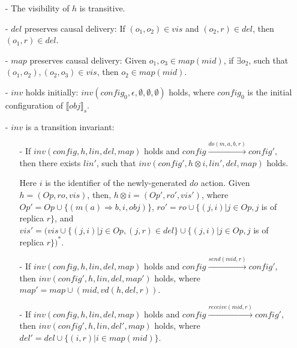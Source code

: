 \begin{itemize}
\setlength{\itemsep}{0.5pt} 
\item[-] The visibility of $h$ is transitive. 

\item[-] $\mathit{del}$ preserves causal delivery: If $(o_1,o_2) \in \mathit{vis}$ and $(o_2,r) \in \mathit{del}$, then $(o_1,r) \in \mathit{del}$. 

\item[-] $\mathit{map}$ preserves causal delivery: Given $o_1,o_3 \in \mathit{map}(\mathit{mid})$, if $\exists o_2$, such that $(o_1,o_2),(o_2,o_3) \in \mathit{vis}$, then $o_2 \in \mathit{map}(\mathit{mid})$. 

\item[-] $\mathit{inv}$ holds initially: $\mathit{inv}(\mathit{config}_0,\epsilon,\emptyset,\emptyset,\emptyset)$ holds, where $\mathit{config}_0$ is the initial configuration of $\llbracket \mathit{obj} \rrbracket_s$.

\item[-] $\mathit{inv}$ is a transition invariant:

    \begin{itemize}
    \setlength{\itemsep}{0.5pt}
    \item[-] If $\mathit{inv}(\mathit{config},h,\mathit{lin},\mathit{del},\mathit{map})$ holds and $\mathit{config} {\xrightarrow{\mathit{do}(m,a,b,r)}} \mathit{config}'$, then there exists $\mathit{lin}'$, such that $\mathit{inv}(\mathit{config}', h \otimes i, \mathit{lin}',\mathit{del},\mathit{map})$ holds.

        Here $i$ is the identifier of the newly-generated $\mathit{do}$ action. Given $h = (\mathit{Op},\mathit{ro},\mathit{vis})$, then, $h \otimes i = (\mathit{Op}',\mathit{ro}',\mathit{vis}')$, where $\mathit{Op}' = \mathit{Op} \cup \{ (m(a) \Rightarrow b,i,\mathit{obj}) \}$, $\mathit{ro}' = \mathit{ro} \cup \{ (j,i) \vert j \in \mathit{Op}, j$ is of replica $r \}$, and $\mathit{vis}' = (\mathit{vis} \cup \{ (j,i) \vert j \in \mathit{Op},(j,r) \in \mathit{del} \} \cup \{ (j,i) \vert j \in \mathit{Op}, j$ is of replica $r \})^*$.

    \item[-] If $\mathit{inv}(\mathit{config},h,\mathit{lin},\mathit{del},\mathit{map})$ holds and $\mathit{config} {\xrightarrow{\mathit{send}(\mathit{mid},r)}} \mathit{config}'$, then $\mathit{inv}(\mathit{config}',h,\mathit{lin},\mathit{del},\mathit{map}')$ holds, where $\mathit{map}' = \mathit{map} \cup (\mathit{mid}, \mathit{vd}(h,\mathit{del},r))$. 


    \item[-] If $\mathit{inv}(\mathit{config},h,\mathit{lin},\mathit{del},\mathit{map})$ holds and $\mathit{config} {\xrightarrow{\mathit{receive}(\mathit{mid},r)}} \mathit{config}'$, then $\mathit{inv}(\mathit{config}',h,\mathit{lin},\mathit{del}',\mathit{map})$ holds, where $\mathit{del}' = \mathit{del} \cup \{ (i,r) \vert i \in \mathit{map}(\mathit{mid}) \}$.
    \end{itemize}
\end{itemize}

